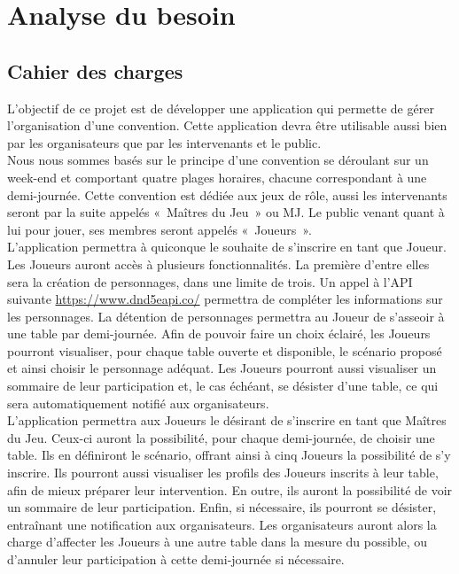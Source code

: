 \documentclass[11pt]{article}
\begin{document}
\newpage


\section{Analyse du besoin}


\subsection{Cahier des charges}
L'objectif de ce projet est de développer une application qui permette de gérer l'organisation d'une convention. Cette application devra être utilisable aussi bien par les organisateurs que par les intervenants et le public.  \\

Nous nous sommes basés sur le principe d'une convention se déroulant sur un week-end et comportant quatre plages horaires, chacune correspondant à une demi-journée. Cette convention est dédiée aux jeux de rôle, aussi les intervenants seront par la suite appelés «~Maîtres du Jeu~» ou MJ. Le public venant quant à lui pour jouer, ses membres seront appelés «~Joueurs~».\\ 

L'application permettra à quiconque le souhaite de s'inscrire en tant que Joueur. Les Joueurs auront accès à plusieurs fonctionnalités. La première d'entre elles sera la création de personnages, dans une limite de trois. Un appel à l'API suivante \textcolor{blue}{\href{https://www.dnd5eapi.co/}{https://www.dnd5eapi.co/}} permettra de compléter les informations sur les personnages. La détention de personnages permettra au Joueur de s'asseoir à une table par demi-journée. Afin de pouvoir faire un choix éclairé, les Joueurs pourront visualiser, pour chaque table ouverte et disponible, le scénario proposé et ainsi choisir le personnage adéquat. Les Joueurs pourront aussi visualiser un sommaire de leur participation et, le cas échéant, se désister d'une table, ce qui sera automatiquement notifié aux organisateurs.\\

L'application permettra aux Joueurs le désirant de s'inscrire en tant que Maîtres du Jeu. Ceux-ci auront la possibilité, pour chaque demi-journée, de choisir une table.  Ils en définiront le scénario, offrant ainsi à cinq Joueurs la possibilité de s'y inscrire. Ils pourront aussi visualiser les profils des Joueurs inscrits à leur table, afin de mieux préparer leur intervention. En outre, ils auront la possibilité de voir un sommaire de leur participation. Enfin, si nécessaire, ils pourront se désister, entraînant une notification aux organisateurs. Les organisateurs auront alors la charge d'affecter les Joueurs à une autre table dans la mesure du possible, ou d'annuler leur participation à cette demi-journée si nécessaire.\\
\end{document}
